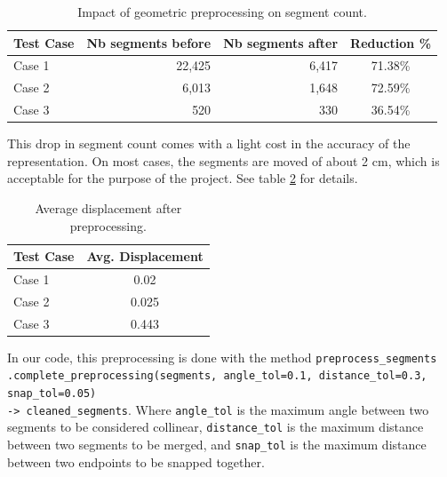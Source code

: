 \documentclass[11pt]{article}
\begin{document}
\begin{table}[htb!]
    \centering
    \begin{tabular}{|l|rrc|}
        \hline
        \textbf{Test Case} & \textbf{Nb segments before} & \textbf{Nb segments after} & \textbf{Reduction \%} \\
        \hline

        Case 1 & 22,425 & 6,417 & 71.38\% \\
        Case 2 & 6,013 & 1,648 & 72.59\% \\
        Case 3 & 520 & 330 & 36.54\% \\
        \hline
    \end{tabular}
    \caption{Impact of geometric preprocessing on segment count.}
    \label{tab:segment_count}
\end{table}

This drop in segment count comes with a light cost in the accuracy of the representation.
On most cases, the segments are moved of about 2 cm, which is acceptable for the
purpose of the project. See table \ref{tab:avg_displacement} for details.

\begin{table}[htb!]
    \centering
    \begin{tabular}{|l|c|}
        \hline

        \textbf{Test Case} & \textbf{Avg. Displacement} \\
        \hline
        Case 1 & 0.02 \\
        Case 2 & 0.025 \\
        Case 3 & 0.443 \\
        \hline

    \end{tabular}
    \caption{Average displacement after preprocessing.}
    \label{tab:avg_displacement}
\end{table}

In our code, this preprocessing is done with the method 
\texttt{preprocess\_segments\\.complete\_preprocessing(segments, angle\_tol=0.1, distance\_tol=0.3, snap\_tol=0.05)\\ -> cleaned\_segments}. 
    Where \texttt{angle\_tol} is the maximum angle between two segments to be considered collinear,
    \texttt{distance\_tol} is the maximum distance between two segments to be merged,
    and \texttt{snap\_tol} is the maximum distance between two endpoints to be snapped together.

\end{document}
